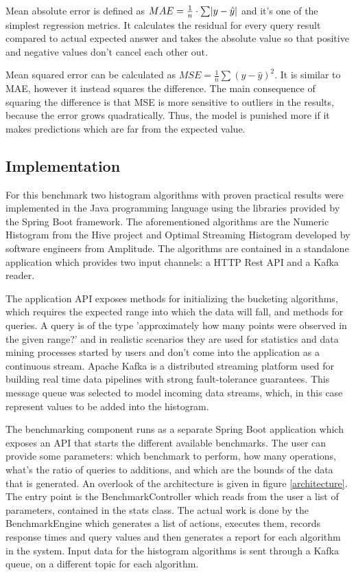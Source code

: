 \documentclass[12pt]{article}
\begin{document}
	Mean absolute error\cite{errormetrics} is defined as $ MAE = \frac{1}{n} \cdot \sum \abs{y - \hat{y}} $
	and it's one of the simplest regression metrics. It calculates the residual for 
	every query result compared to actual expected answer and takes the absolute 
	value so that positive and negative values don't cancel each other out.

	Mean squared error\cite{errormetrics} can be calculated as $ MSE = \frac{1}{n}
	\sum (y - \hat{y})^2 $. It is similar to MAE, however it instead squares the difference.
	The main consequence of squaring the difference is that MSE is more sensitive 
	to outliers in the results, because the error grows quadratically. Thus, the model 
	is punished more if it makes predictions which are far from the expected value.

	\subsection{Implementation}
	For this benchmark two histogram algorithms with proven practical results 
	were implemented in the Java programming language using the libraries 
	provided by the Spring Boot framework. 
	The aforementioned algorithms are the Numeric Histogram\cite{HiveImplementation} 
	from the Hive project and Optimal Streaming Histogram\cite{OSHistograms} developed 
	by software engineers from Amplitude. The algorithms are contained in a standalone 
	application which provides two input channels: a HTTP Rest API and a Kafka reader.

	The application API exposes methods for initializing the bucketing algorithms, 
	which requires the expected range into which the data will fall, and methods 
	for queries. A query is of the type 'approximately how many points were observed
	in the given range?' and in realistic scenarios they are used for statistics 
	and data mining processes started by users and don't come into the application 
	as a continuous stream. Apache Kafka\cite{Kafka} is a distributed streaming platform
	used for building real time data pipelines with strong fault-tolerance guarantees.
	This message queue was selected to model incoming data streams, which, in this 
	case represent values to be added into the histogram.

	The benchmarking component runs as a separate Spring Boot application which 
	exposes an API that starts the different available benchmarks. The user 
	can provide some parameters: which benchmark to perform, how many operations, 
	what's the ratio of queries to additions, and which are the bounds of the data that is 
	generated. An overlook of the architecture is given in figure \ref{architecture}.
	The entry point is the BenchmarkController which reads from the user a list of 
	parameters, contained in the stats class. The actual work is done by the BenchmarkEngine
	which generates a list of actions, executes them, records response times and query values 
	and then generates a report for each algorithm in the system. Input data for the 
	histogram algorithms is sent through a Kafka queue, on a different topic for each 
	algorithm.
\end{document}
